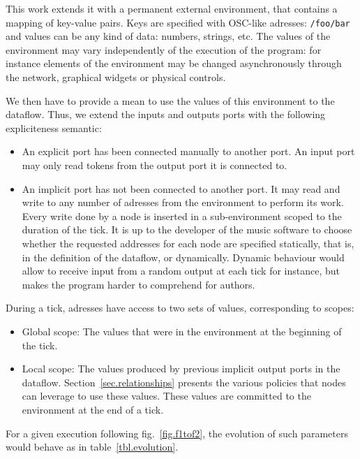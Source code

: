 \documentclass{article}
\begin{document}
This work extends it with a permanent external environment, that contains a mapping of key-value pairs.
Keys are specified with OSC-like\cite{Freed09featuresand} adresses: \lstinline|/foo/bar| and values can be any kind of data: numbers, strings, etc. 
The values of the environment may vary independently of the execution of the program: for instance elements of the environment may be changed asynchronously through the network, graphical widgets or physical controls.
    
We then have to provide a mean to use the values of this environment to the dataflow.
Thus, we extend the inputs and outputs ports with the following expliciteness semantic: 
    
\begin{itemize}
  \item An explicit port has been connected manually to another port.
        An input port may only read tokens from the output port it is connected to.
  \item An implicit port has not been connected to another port. 
        It may read and write to any number of adresses from the environment to perform its work.
        Every write done by a node is inserted in a sub-environment scoped to the duration of the tick.
        It is up to the developer of the music software to choose whether the requested addresses for each node are specified statically, that is, in the definition of the dataflow, or dynamically.
        Dynamic behaviour would allow to receive input from a random output at each tick for instance, but makes the program harder to comprehend for authors.
\end{itemize}
    
During a tick, adresses have access to two sets of values, corresponding to scopes: 
\begin{itemize}
  \item Global scope: The values that were in the environment at the beginning of the tick.
  \item Local scope: The values produced by previous implicit output ports in the dataflow.
        Section~\ref{sec.relationships} presents the various policies that nodes can leverage to 
        use these values. 
        These values are committed to the environment at the end of a tick.
\end{itemize}

For a given execution following fig.~\ref{fig.f1tof2}, the evolution of such parameters would behave as in table~\ref{tbl.evolution}.
\end{document}
